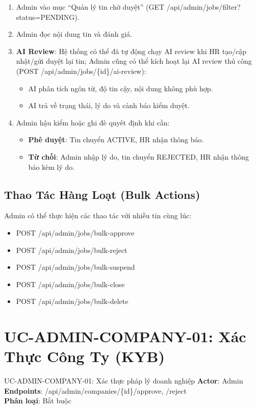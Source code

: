 \documentclass[12pt, a4paper]{report}
\begin{document}
\begin{enumerate}
    \item Admin vào mục ``Quản lý tin chờ duyệt'' (GET /api/admin/jobs/filter?status=PENDING).
    \item Admin đọc nội dung tin và đánh giá.
    \item \textbf{AI Review}: Hệ thống có thể đã tự động chạy AI review khi HR tạo/cập nhật/gửi duyệt lại tin; Admin cũng có thể kích hoạt lại AI review thủ công (POST /api/admin/jobs/\{id\}/ai-review):
    \begin{itemize}
        \item AI phân tích ngôn từ, độ tin cậy, nội dung không phù hợp.
        \item AI trả về trạng thái, lý do và cảnh báo kiểm duyệt.
    \end{itemize}
    \item Admin hậu kiểm hoặc ghi đè quyết định khi cần:
    \begin{itemize}
        \item \textbf{Phê duyệt}: Tin chuyển ACTIVE, HR nhận thông báo.
        \item \textbf{Từ chối}: Admin nhập lý do, tin chuyển REJECTED, HR nhận thông báo kèm lý do.
    \end{itemize}
\end{enumerate}

\subsection{Thao Tác Hàng Loạt (Bulk Actions)}

Admin có thể thực hiện các thao tác với nhiều tin cùng lúc:
\begin{itemize}
    \item POST /api/admin/jobs/bulk-approve
    \item POST /api/admin/jobs/bulk-reject
    \item POST /api/admin/jobs/bulk-suspend
    \item POST /api/admin/jobs/bulk-close
    \item POST /api/admin/jobs/bulk-delete
\end{itemize}

\section{UC-ADMIN-COMPANY-01: Xác Thực Công Ty (KYB)}

\begin{requirementbox}{UC-ADMIN-COMPANY-01: Xác thực pháp lý doanh nghiệp}
\textbf{Actor}: Admin \\
\textbf{Endpoints}: /api/admin/companies/\{id\}/approve, /reject \\
\textbf{Phân loại}: Bắt buộc
\end{requirementbox}
\end{document}

